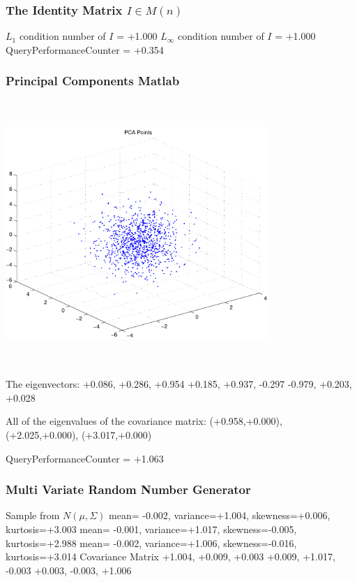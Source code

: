 \documentclass[9pt]{article}
\theoremstyle{plain}
\theoremstyle{definition}
\theoremstyle{remark}
\numberwithin{equation}{section}
\begin{document}
\subsubsection{The Identity Matrix $I \in M(n)$}
$L_1$ condition number of $I$ = +1.000
$L_\infty$ condition number of $I$ = +1.000
QueryPerformanceCounter  =  +0.354
\subsubsection{Principal Components Matlab }
\includegraphics[width=10.0cm,height=10.0cm]{PCAPoints.pdf}

The eigenvectors:
+0.086, +0.286, +0.954
+0.185, +0.937, -0.297
-0.979, +0.203, +0.028

All of the eigenvalues of the covariance matrix:
(+0.958,+0.000), (+2.025,+0.000), (+3.017,+0.000)

QueryPerformanceCounter  =  +1.063
\subsubsection{Multi Variate Random Number Generator }
Sample from $N(\mu,\Sigma)$
mean= -0.002, variance=+1.004, skewness=+0.006, kurtosis=+3.003
mean= -0.001, variance=+1.017, skewness=-0.005, kurtosis=+2.988
mean= -0.002, variance=+1.006, skewness=-0.016, kurtosis=+3.014
Covariance Matrix 
+1.004, +0.009, +0.003
+0.009, +1.017, -0.003
+0.003, -0.003, +1.006
\end{document}
